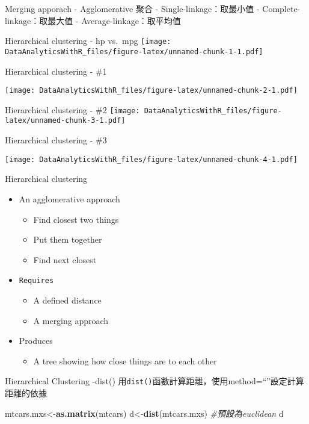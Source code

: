 \documentclass[]{book}
\newenvironment{Shaded}{\begin{snugshade}}{\end{snugshade}}
\newcommand{\KeywordTok}[1]{\textcolor[rgb]{0.13,0.29,0.53}{\textbf{{#1}}}}
\newcommand{\CommentTok}[1]{\textcolor[rgb]{0.56,0.35,0.01}{\textit{{#1}}}}
\newcommand{\NormalTok}[1]{{#1}}
\providecommand{\tightlist}{%
  \setlength{\itemsep}{0pt}\setlength{\parskip}{0pt}}
\begin{document}
Merging apporach - Agglomerative 聚合 - Single-linkage：取最小值 -
Complete-linkage：取最大值 - Average-linkage：取平均值

Hierarchical clustering - hp vs.~mpg
\texttt{[image: DataAnalyticsWithR\_files/figure-latex/unnamed-chunk-1-1.pdf]}

Hierarchical clustering - \#1

\texttt{[image: DataAnalyticsWithR\_files/figure-latex/unnamed-chunk-2-1.pdf]}

Hierarchical clustering - \#2
\texttt{[image: DataAnalyticsWithR\_files/figure-latex/unnamed-chunk-3-1.pdf]}

Hierarchical clustering - \#3

\texttt{[image: DataAnalyticsWithR\_files/figure-latex/unnamed-chunk-4-1.pdf]}

Hierarchical clustering

\begin{itemize}
\tightlist
\item
  An agglomerative approach

  \begin{itemize}
  \tightlist
  \item
    Find closest two things
  \item
    Put them together
  \item
    Find next closest
  \end{itemize}
\item
  \texttt{Requires}

  \begin{itemize}
  \tightlist
  \item
    A defined distance
  \item
    A merging approach
  \end{itemize}
\item
  Produces

  \begin{itemize}
  \tightlist
  \item
    A tree showing how close things are to each other
  \end{itemize}
\end{itemize}

Hierarchical Clustering -dist()
用\texttt{dist()}函數計算距離，使用method=``''設定計算距離的依據

\begin{Shaded}
\begin{Highlighting}[]
\NormalTok{mtcars.mxs<-}\KeywordTok{as.matrix}\NormalTok{(mtcars)}
\NormalTok{d<-}\KeywordTok{dist}\NormalTok{(mtcars.mxs) }\CommentTok{#預設為euclidean}
\NormalTok{d}
\end{Highlighting}
\end{Shaded}
\end{document}
